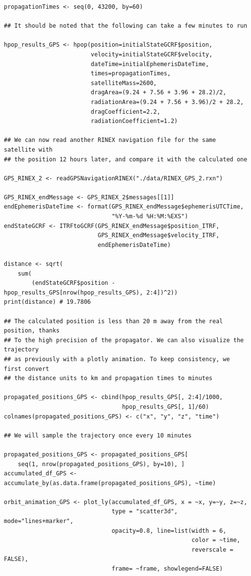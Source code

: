 \begin{verbatim}
propagationTimes <- seq(0, 43200, by=60)

## It should be noted that the following can take a few minutes to run

hpop_results_GPS <- hpop(position=initialStateGCRF$position,
                         velocity=initialStateGCRF$velocity,
                         dateTime=initialEphemerisDateTime,
                         times=propagationTimes,
                         satelliteMass=2600,
                         dragArea=(9.24 + 7.56 + 3.96 + 28.2)/2,
                         radiationArea=(9.24 + 7.56 + 3.96)/2 + 28.2,
                         dragCoefficient=2.2,
                         radiationCoefficient=1.2)

## We can now read another RINEX navigation file for the same satellite with
## the position 12 hours later, and compare it with the calculated one

GPS_RINEX_2 <- readGPSNavigationRINEX("./data/RINEX_GPS_2.rxn")

GPS_RINEX_endMessage <- GPS_RINEX_2$messages[[1]]
endEphemerisDateTime <- format(GPS_RINEX_endMessage$ephemerisUTCTime, 
                               "%Y-%m-%d %H:%M:%EXS")
endStateGCRF <- ITRFtoGCRF(GPS_RINEX_endMessage$position_ITRF, 
                           GPS_RINEX_endMessage$velocity_ITRF,
                           endEphemerisDateTime)

distance <- sqrt(
    sum(
        (endStateGCRF$position - hpop_results_GPS[nrow(hpop_results_GPS), 2:4])^2))
print(distance) # 19.7806

## The calculated position is less than 20 m away from the real position, thanks
## To the high precision of the propagator. We can also visualize the trajectory
## as previously with a plotly animation. To keep consistency, we first convert
## the distance units to km and propagation times to minutes

propagated_positions_GPS <- cbind(hpop_results_GPS[, 2:4]/1000,
                                  hpop_results_GPS[, 1]/60)
colnames(propagated_positions_GPS) <- c("x", "y", "z", "time")

## We will sample the trajectory once every 10 minutes

propagated_positions_GPS <- propagated_positions_GPS[
    seq(1, nrow(propagated_positions_GPS), by=10), ]
accumulated_df_GPS <- accumulate_by(as.data.frame(propagated_positions_GPS), ~time)

orbit_animation_GPS <- plot_ly(accumulated_df_GPS, x = ~x, y=~y, z=~z,
                               type = "scatter3d", mode="lines+marker", 
                               opacity=0.8, line=list(width = 6,
                                                      color = ~time,
                                                      reverscale = FALSE),
                               frame= ~frame, showlegend=FALSE)


\end{verbatim}
